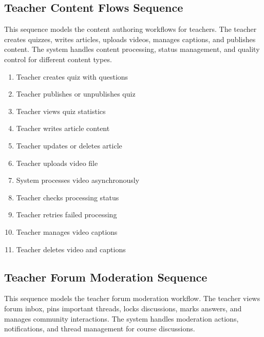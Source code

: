
\subsection{Teacher Content Flows Sequence}
This sequence models the content authoring workflows for teachers. The teacher
creates quizzes, writes articles, uploads videos, manages captions, and
publishes content. The system handles content processing, status management,
and quality control for different content types.

\begin{enumerate}[topsep=0pt,itemsep=1pt,parsep=0pt,partopsep=0pt]
    \item Teacher creates quiz with questions
    \item Teacher publishes or unpublishes quiz
    \item Teacher views quiz statistics
    \item Teacher writes article content
    \item Teacher updates or deletes article
    \item Teacher uploads video file
    \item System processes video asynchronously
    \item Teacher checks processing status
    \item Teacher retries failed processing
    \item Teacher manages video captions
    \item Teacher deletes video and captions
\end{enumerate}


\subsection{Teacher Forum Moderation Sequence}
This sequence models the teacher forum moderation workflow. The teacher views
forum inbox, pins important threads, locks discussions, marks answers, and
manages community interactions. The system handles moderation actions,
notifications, and thread management for course discussions.

